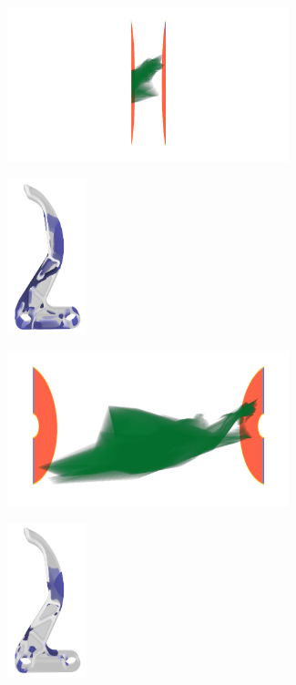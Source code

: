 \documentclass[a4paper,fontsize=12pt,toc=bib,halfparskip]{scrartcl}
\begin{document}
\begin{figure}[p]
	\begin{subfigure}{0.49\textwidth}
		\centering
		\includegraphics[height=4.5cm]{pictures/results/Bremshebel_K_InvariantSpace1.png}
		\subcaption{}
		\label{BremshebelKInvariant1}
	\end{subfigure}
	\hspace*{\fill}
	\begin{subfigure}{0.49\textwidth}
		\centering
		\includegraphics[height=4.5cm]{pictures/results/Bremshebel_K_Object1.png}
		\subcaption{}
		\label{BremshebelKObject1}
	\end{subfigure}
	\medskip
	\begin{subfigure}{0.49\textwidth}
		\centering
		\includegraphics[height=4.5cm]{pictures/results/Bremshebel_K_InvariantSpace2.png}
		\subcaption{}
		\label{BremshebelKInvariant2}
	\end{subfigure}
	\hspace*{\fill}
	\begin{subfigure}{0.49\textwidth}
		\centering
		\includegraphics[height=4.5cm]{pictures/results/Bremshebel_K_Object2.png}

\end{subfigure}
\end{figure}
\end{document}

